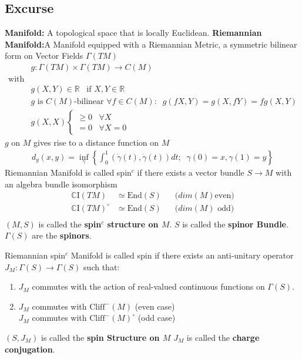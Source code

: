 \subsection{Excurse}
\textbf{Manifold:} A topological space that is locally Euclidean.
\newline
\textbf{Riemannian Manifold:}A Manifold equipped with a Riemannian
Metric, a
symmetric bilinear form on Vector Fields $\Gamma(TM)$
\begin{align}
    &g: \Gamma(TM) \times \Gamma(TM) \rightarrow C(M) \\
    \text{with}& \nonumber\\
    &g(X, Y) \in \mathbb{R} \;\;\; \text{if $X, Y \in \mathbb{R}$}\\
    &\text{$g$ is $C(M)$-bilinear } \forall f\in C(M):\;\; g(fX, Y) =
    g(X,
    fY) = fg(X,Y)\\
    &g(X,X) \begin{cases}\geq 0  \;\;\; \forall X \\ = 0 \;\;\; \forall X
        =0
    \end{cases}
\end{align}
$g$ on $M$ gives rise to a distance function on $M$
\begin{align}
    d_g(x, y) = \inf_\gamma \left\{\int_0^1(\dot{\gamma}(t),
    \dot{\gamma}(t))dt;\;\; \gamma(0) = x, \gamma(1) = y \right\}
\end{align}
Riemannian Manifold is called spin$^c$ if there exists a vector bundle $S
\rightarrow M$ with an algebra bundle isomorphism
\begin{align}
    \mathbb{C}\text{I}(TM) &\simeq \text{End}(S)\;\;\; &\text{($dim(M)$
    even)}\\
    \mathbb{C}\text{I}(TM)^\circ &\simeq \text{End}(S)\;\;\;
    &\text{($dim(M)$ odd)}\\
\end{align}
$(M,S)$ is called the \textbf{spin$^c$ structure on $M$}.
\newline
$S$ is called the \textbf{spinor Bundle}.
\newline
$\Gamma(S)$ are the \textbf{spinors}.

Riemannian spin$^c$ Manifold is called spin if there exists an
anti-unitary
operator $J_M:\Gamma(S) \rightarrow \Gamma(S)$ such that:
\begin{enumerate}
    \item $J_M$ commutes with the action of real-valued  continuous
        functions
        on $\Gamma(S)$.
    \item $J_M$ commutes with $\text{Cliff}^-(M)$ (even case)\\
    $J_M$ commutes with $\text{Cliff}^-(M)^\circ$ (odd case)
\end{enumerate}
$(S, J_M)$ is called the \textbf{spin Structure on $M$}
\newline
$J_M$ is called the \textbf{charge conjugation}.

